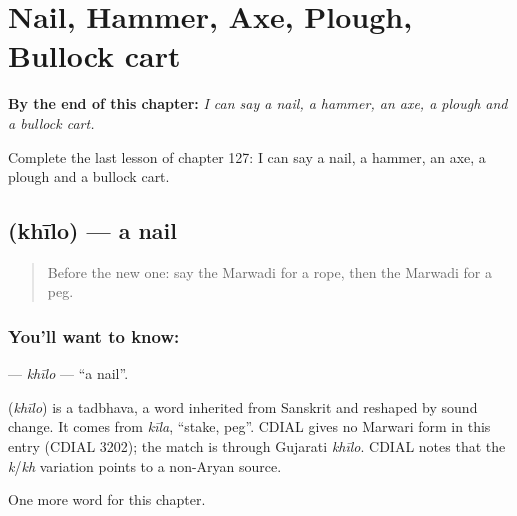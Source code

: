 
\chapter{Nail, Hammer, Axe, Plough, Bullock cart}
\label{ch:mw-nail-hammer-axe-plough-bullock-cart}

\begin{chapteropening}
\textbf{By the end of this chapter:} \emph{I can say a nail, a hammer, an axe, a plough and a bullock cart.}

Complete the last lesson of chapter 127: I can say a nail, a hammer, an axe, a plough and a bullock cart.
\end{chapteropening}

\section[\texorpdfstring{\mw{खीलो} (khīlo)}{खीलो (khīlo)}]{ (khīlo) — a nail}

\label{lesson:MW-C127-khilo}



\begin{quote}
Before the new one: say the Marwadi for a rope, then the Marwadi for a peg.
\end{quote}

\subsection*{You'll want to know: }
\textbf{} — \emph{khīlo} — \textquotedblleft{}a nail\textquotedblright{}.

\begin{cousinweb}
\textbf{} (\emph{khīlo}) is a tadbhava, a word inherited from Sanskrit and reshaped by sound change. It comes from \emph{kīla}, \textquotedblleft{}stake, peg\textquotedblright{}. CDIAL gives no Marwari form in this entry (CDIAL 3202); the match is through Gujarati \emph{khīlo}. CDIAL notes that the \emph{k}/\emph{kh} variation points to a non-Aryan source.
\end{cousinweb}

\begin{grammarlens}[title={What you've built}]
One more word for this chapter.
\end{grammarlens}

